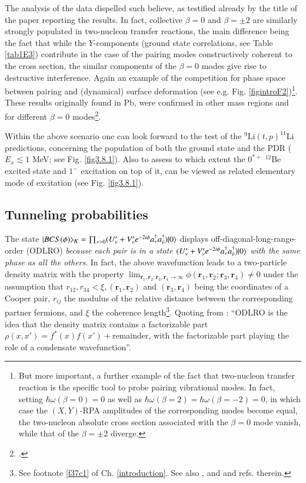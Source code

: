 The analysis of the data dispelled such believe, as testified already by the title of the paper reporting the results. In fact, collective $\beta=0$ and $\beta=\pm2$ are similarly strongly populated in two-nucleon transfer reactions, the main difference being the fact that while the $Y$-components (ground state correlations, see Table  \ref{tab1E3}) contribute in the case of the pairing modes constructively coherent to the cross section, the similar components of the $\beta=0$ modes give rise to destructive interference. Again an example of the competition for phase space between pairing and (dynamical) surface deformation (see e.g. Fig. \ref{figintroF2})\footnote{But more important, a further example of the fact that two-nucleon transfer reaction is the specific tool to probe pairing vibrational modes. In fact, setting $\hbar\omega(\beta=0)=0$ as well as $\hbar\omega(\beta=2)=\hbar\omega(\beta=-2)=0$, in which case the $(X,Y)$-RPA amplitudes of the corresponding modes become equal, the two-nucleon absolute cross section associated with the $\beta=0$ mode vanish, while that of the $\beta=\pm2$ diverge.}. These results originally found in Pb, were confirmed in other mass regions and for different $\beta=0$ modes\footnote{\cite{Broglia:71}.}. 


Within the above scenario one can look forward to the test of the $^9$Li$(t,p)^{11}$Li predictions, concerning the population of both the ground state and the PDR ($E_x\lesssim1$ MeV; see Fig. \ref{fig3.8.1}). Also to assess to which extent the $0^{*+}$ $^{12}$Be excited state and $1^-$ excitation on top of it, can be viewed as related elementary mode of excitation (see Fig. \ref{fig3.8.1}).
 \subsection{Tunneling probabilities}\label{App4.B.3}
 The state $ |{BCS(\phi)} \rangle_{\mathcal K}=\prod_{\nu>0}(U'_\nu+V'_\nu e^{-2i\phi} a_\nu^\dagger a_{\bar{\nu}}^\dagger)|{0} \rangle$  displays off-diagonal-long-range-order (ODLRO) \textit{because each pair is in a state $(U'_\nu+V'_\nu e^{-2i\phi} a_\nu^\dagger a_{\bar{\nu}}^\dagger)|{0} \rangle$ with the same phase as all the others}. In fact, the above wavefunction  leads to a two-particle density matrix with the property $\lim_{\mathbf r_1, \mathbf r_2;\mathbf r_3, \mathbf r_4\rightarrow\infty}\phi(\mathbf r_1, \mathbf r_2;\mathbf r_3, \mathbf r_4)\neq 0$ under the assumption that $r_{12}, r_{34}<\xi, (\mathbf r_1, \mathbf r_2)$ and $(\mathbf r_3, \mathbf r_4)$ being the coordinates of a Cooper pair, $r_{ij}$ the  modulus of the  relative distance between the corresponding partner fermions, and $\xi$ the coherence length\footnote{See footnote \ref{f37c1} of Ch. \ref{introduction}. See also \cite{Ambegaokar:69}, and \cite{Potel:17} and refs. therein.}. Quoting from \cite{Anderson:96}: ``ODLRO is the idea that the density matrix contains a factorizable part $\rho(x,x')=f^*(x)f(x')+$remainder, with the factorizable part playing the role of a condensate wavefunction''.
 

